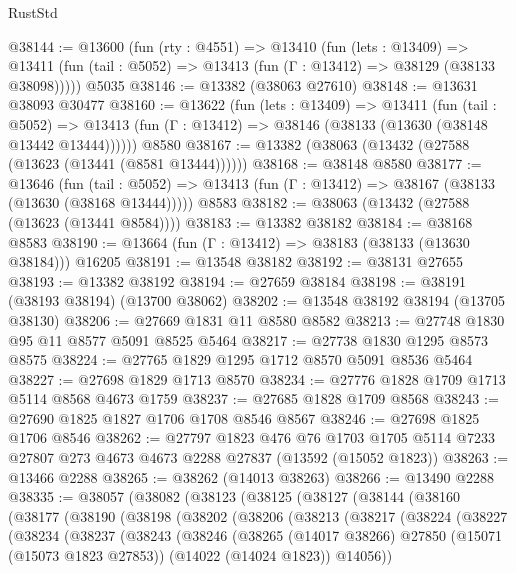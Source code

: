 \begin{lexlean}{RustStd}
\begin{coremodule}
@38144 := @13600
    (fun (rty : @4551) =>
    @13410
      (fun (lets : @13409) =>
      @13411 (fun (tail : @5052) => @13413 (fun (Γ : @13412) => @38129 (@38133 @38098)))))
    @5035
@38146 := @13382 (@38063 @27610)
@38148 := @13631 @38093 @30477
@38160 := @13622
    (fun (lets : @13409) =>
    @13411
      (fun (tail : @5052) =>
      @13413 (fun (Γ : @13412) => @38146 (@38133 (@13630 (@38148 @13442 @13444))))))
    @8580
@38167 := @13382 (@38063 (@13432 (@27588 (@13623 (@13441 (@8581 @13444))))))
@38168 := @38148 @8580
@38177 := @13646
    (fun (tail : @5052) => @13413 (fun (Γ : @13412) => @38167 (@38133 (@13630 (@38168 @13444)))))
    @8583
@38182 := @38063 (@13432 (@27588 (@13623 (@13441 @8584))))
@38183 := @13382 @38182
@38184 := @38168 @8583
@38190 := @13664 (fun (Γ : @13412) => @38183 (@38133 (@13630 @38184))) @16205
@38191 := @13548 @38182
@38192 := @38131 @27655
@38193 := @13382 @38192
@38194 := @27659 @38184
@38198 := @38191 (@38193 @38194) (@13700 @38062)
@38202 := @13548 @38192 @38194 (@13705 @38130)
@38206 := @27669 @1831 @11 @8580 @8582
@38213 := @27748 @1830 @95 @11 @8577 @5091 @8525 @5464
@38217 := @27738 @1830 @1295 @8573 @8575
@38224 := @27765 @1829 @1295 @1712 @8570 @5091 @8536 @5464
@38227 := @27698 @1829 @1713 @8570
@38234 := @27776 @1828 @1709 @1713 @5114 @8568 @4673 @1759
@38237 := @27685 @1828 @1709 @8568
@38243 := @27690 @1825 @1827 @1706 @1708 @8546 @8567
@38246 := @27698 @1825 @1706 @8546
@38262 := @27797
    @1823
    @476
    @76
    @1703
    @1705
    @5114
    @7233
    @27807
    @273
    @4673
    @4673
    @2288
    @27837
    (@13592 (@15052 @1823))
@38263 := @13466 @2288
@38265 := @38262 (@14013 @38263)
@38266 := @13490 @2288
@38335 := @38057
    (@38082
      (@38123
        (@38125
          (@38127
            (@38144
              (@38160
                (@38177
                  (@38190
                    (@38198
                      (@38202
                        (@38206
                          (@38213
                            (@38217
                              (@38224
                                (@38227
                                  (@38234
                                    (@38237
                                      (@38243
                                        (@38246
                                          (@38265
                                            (@14017 @38266)
                                            @27850
                                            (@15071 (@15073 @1823 @27853))
                                            (@14022 (@14024 @1823))
                                            @14056))

\end{coremodule}
\end{lexlean}
